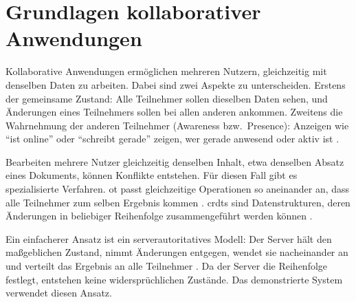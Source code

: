 \section{Grundlagen kollaborativer Anwendungen}
\label{sec:kollab}

Kollaborative Anwendungen ermöglichen mehreren Nutzern, gleichzeitig mit denselben Daten zu arbeiten. Dabei sind zwei Aspekte zu unterscheiden. Erstens der gemeinsame Zustand: Alle Teilnehmer sollen dieselben Daten sehen, und Änderungen eines Teilnehmers sollen bei allen anderen ankommen. Zweitens die Wahrnehmung der anderen Teilnehmer (Awareness bzw.\ Presence): Anzeigen wie \enquote{ist online} oder \enquote{schreibt gerade} zeigen, wer gerade anwesend oder aktiv ist .

Bearbeiten mehrere Nutzer gleichzeitig denselben Inhalt, etwa denselben Absatz eines Dokuments, können Konflikte entstehen. Für diesen Fall gibt es spezialisierte Verfahren. \gls{ot} passt gleichzeitige Operationen so aneinander an, dass alle Teilnehmer zum selben Ergebnis kommen . \glspl{crdt} sind Datenstrukturen, deren Änderungen in beliebiger Reihenfolge zusammengeführt werden können \X[Shapiro et al. 2011].

Ein einfacherer Ansatz ist ein serverautoritatives Modell: Der Server hält den maßgeblichen Zustand, nimmt Änderungen entgegen, wendet sie nacheinander an und verteilt das Ergebnis an alle Teilnehmer \X[Kleppmann 2017]. Da der Server die Reihenfolge festlegt, entstehen keine widersprüchlichen Zustände. Das demonstrierte System verwendet diesen Ansatz.
